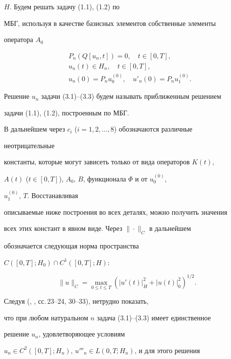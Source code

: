 $H$. Будем решать задачу (1.1), (1.2) по 


МБГ, используя в качестве базисных элементов собственные элементы 


оператора $A_0$


\begin{align} 


& P_n(Q[u_n,t])=0,\quad t\in[0,T], \\ 


& u_n(t)\in H_n,\quad t\in [0,T], \\ 


& u_n(0)=P_n u^{(0)}_0,\quad u'_n(0)=P_n u^{(0)}_1. 


\end{align} 


Решение $u_n$ задачи (3.1)--(3.3) будем называть приближенным решением 


задачи (1.1), (1.2), построенным по МБГ. 


 


В дальнейшем через $c_i$ ($i=1,2,\dotsc,8$) обозначаются различные 


неотрицательные 


константы, которые могут зависеть только от вида операторов $K(t)$, 


$A(t)$ ($t\in[0,T]$), $A_0$, $B$, функционала $\Phi$ и от $u^{(0)}_0$, 


$u^{(0)}_1$, $T$. Восстанавливая 


описываемые ниже построения во всех деталях, можно получить значения 


всех этих констант в явном виде. Через $\|\cdot\|_C$ в дальнейшем 


обозначается следующая норма пространства 


$C([0,T];H_0)\cap C^1([0,T];H)$:


$$ 


\|u\|_C=\max_{0\le t\le T} 


(|u'(t)|^2_H+|u(t)|^2_0)^{1/2}. 


$$ 


 


Следуя (\cite{10}, \cite{12}, сс.\,23--24, 30--33), нетрудно показать, 


что при любом натуральном $n$ задача (3.1)--(3.3) имеет единственное 


решение $u_n$, удовлетворяющее условиям 


$u_n\in C^2([0,T];H_n)$, $u'''_n\in L(0,T;H_n)$, и для этого решения 


